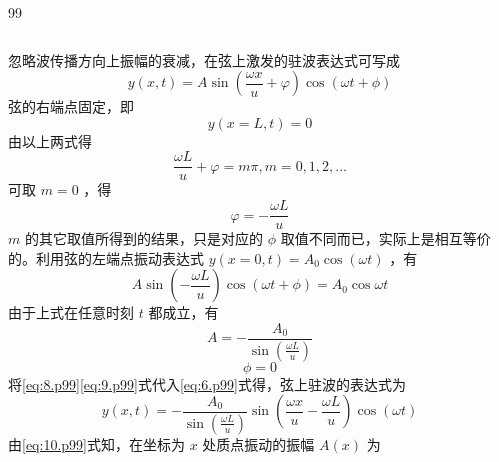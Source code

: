 \begin{solution}{99}
\begin{subsolution}
\begin{subsubsolution}
\begin{equation}
                \label{eq:5.p99}
            \end{equation}
        \end{subsubsolution}
        \begin{subsubsolution}
            忽略波传播方向上振幅的衰减，在弦上激发的驻波表达式可写成
            \begin{equation}
                y (x, t) = A \sin \left(\frac {\omega x}{u} + \varphi\right) \cos (\omega t + \phi)
                \label{eq:6.p99}
            \end{equation}
            弦的右端点固定，即
            \begin{equation*}
                y (x = L, t) = 0
            \end{equation*}
            由以上两式得
            \begin{equation*}
                \frac {\omega L}{u} + \varphi = m \pi , m = 0, 1, 2, \dots
            \end{equation*}
            可取 $m = 0$ ，得
            \begin{equation}
                \varphi = - \frac {\omega L}{u}
                \label{eq:7.p99}
            \end{equation}
            $m$ 的其它取值所得到的结果，只是对应的 $\phi$ 取值不同而已，实际上是相互等价的。利用弦的左端点振动表达式 $y(x = 0, t) = A_0 \cos (\omega t)$ ，有
            \begin{equation*}
                A \sin \left(- \frac {\omega L}{u}\right) \cos (\omega t + \phi) = A _ {0} \cos \omega t
            \end{equation*}
            由于上式在任意时刻 $t$ 都成立，有
            \begin{equation}
                A = - \frac {A _ {0}}{\sin \left(\frac {\omega L}{u}\right)}
                \label{eq:8.p99}
            \end{equation}
            \begin{equation}
                \phi = 0
                \label{eq:9.p99}
            \end{equation}
            将\eqref{eq:8.p99}\eqref{eq:9.p99}式代入\eqref{eq:6.p99}式得，弦上驻波的表达式为
            \begin{equation}
                y (x, t) = - \frac {A _ {0}}{\sin \left(\frac {\omega L}{u}\right)} \sin \left(\frac {\omega x}{u} - \frac {\omega L}{u}\right) \cos (\omega t)
                \label{eq:10.p99}
            \end{equation}
            由\eqref{eq:10.p99}式知，在坐标为 $x$ 处质点振动的振幅 $A(x)$ 为

\end{subsubsolution}
\end{subsolution}
\end{solution}
